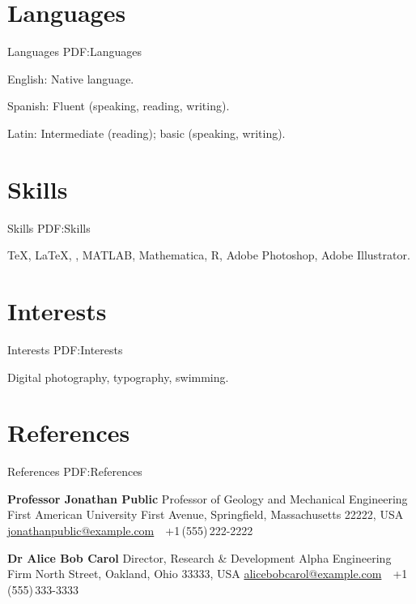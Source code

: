 \documentclass[letterpaper,MMMyyyy,nonstop]{simpleresumecv}
\begin{document}
\begin{body}

\section
{Languages}
{Languages}
{PDF:Languages}

\BulletItem
English: Native language.

\GapNoBreak
\BulletItem
Spanish: Fluent (speaking, reading, writing).

\GapNoBreak
\BulletItem
Latin: Intermediate (reading); basic (speaking, writing).


\section
{Skills}
{Skills}
{PDF:Skills}

{\TeX}, {\LaTeX}, {\XeLaTeX},
MATLAB,
Mathematica,
R,
Adobe Photoshop,
Adobe Illustrator.


\section
{Interests}
{Interests}
{PDF:Interests}

Digital photography,
typography,
swimming.


\section
{References}
{References}
{PDF:References}

\BulletItem
\textbf{Professor Jonathan Public}
\newline
Professor of Geology and Mechanical Engineering
\newline
First American University
 First Avenue, Springfield, Massachusetts 22222, USA
\newline
\href{mailto:jonathanpublic@example.com}
{jonathanpublic@example.com}
\,\SubBulletSymbol\,
+1\,(555)\,222-2222

\BigGap
\BulletItem
\textbf{Dr Alice Bob Carol}
\newline
Director, Research \& Development
\newline
Alpha Engineering Firm
 North Street, Oakland, Ohio 33333, USA
\newline
\href{mailto:alicebobcarol@example.com}
{alicebobcarol@example.com}
\,\SubBulletSymbol\,
+1\,(555)\,333-3333


\end{body}
\end{document}
